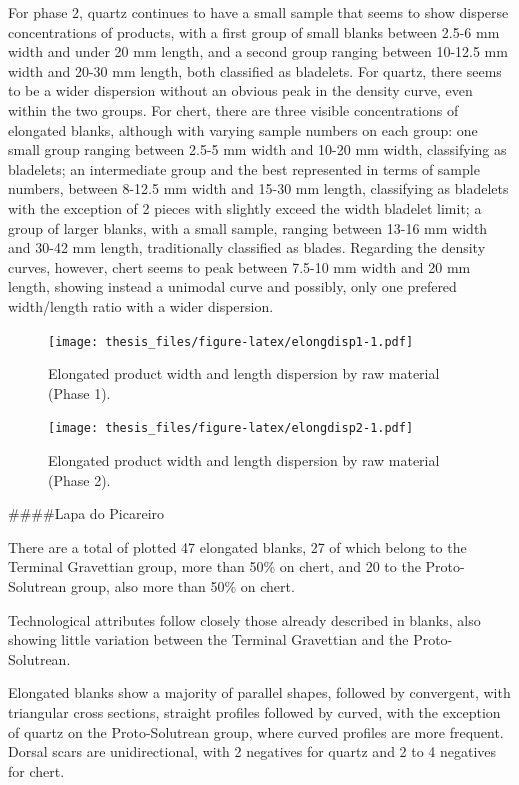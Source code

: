 \documentclass[12pt,twoside]{reedthesis}
\begin{document}
For phase 2, quartz continues to have a small sample that seems to show disperse concentrations of products, with a first group of small blanks between 2.5-6 mm width and under 20 mm length, and a second group ranging between 10-12.5 mm width and 20-30 mm length, both classified as bladelets. For quartz, there seems to be a wider dispersion without an obvious peak in the density curve, even within the two groups. For chert, there are three visible concentrations of elongated blanks, although with varying sample numbers on each group: one small group ranging between 2.5-5 mm width and 10-20 mm width, classifying as bladelets; an intermediate group and the best represented in terms of sample numbers, between 8-12.5 mm width and 15-30 mm length, classifying as bladelets with the exception of 2 pieces with slightly exceed the width bladelet limit; a group of larger blanks, with a small sample, ranging between 13-16 mm width and 30-42 mm length, traditionally classified as blades. Regarding the density curves, however, chert seems to peak between 7.5-10 mm width and 20 mm length, showing instead a unimodal curve and possibly, only one prefered width/length ratio with a wider dispersion.
\begin{figure}
\centering
\texttt{[image: thesis\_files/figure-latex/elongdisp1-1.pdf]}
\caption{\label{fig:elongdisp1}Elongated product width and length dispersion by raw material (Phase 1).}
\end{figure}
\begin{figure}
\centering
\texttt{[image: thesis\_files/figure-latex/elongdisp2-1.pdf]}
\caption{\label{fig:elongdisp2}Elongated product width and length dispersion by raw material (Phase 2).}
\end{figure}
\#\#\#\#Lapa do Picareiro

There are a total of plotted 47 elongated blanks, 27 of which belong to the Terminal Gravettian group, more than 50\% on chert, and 20 to the Proto-Solutrean group, also more than 50\% on chert.

Technological attributes follow closely those already described in blanks, also showing little variation between the Terminal Gravettian and the Proto-Solutrean.

Elongated blanks show a majority of parallel shapes, followed by convergent, with triangular cross sections, straight profiles followed by curved, with the exception of quartz on the Proto-Solutrean group, where curved profiles are more frequent. Dorsal scars are unidirectional, with 2 negatives for quartz and 2 to 4 negatives for chert.
\end{document}

